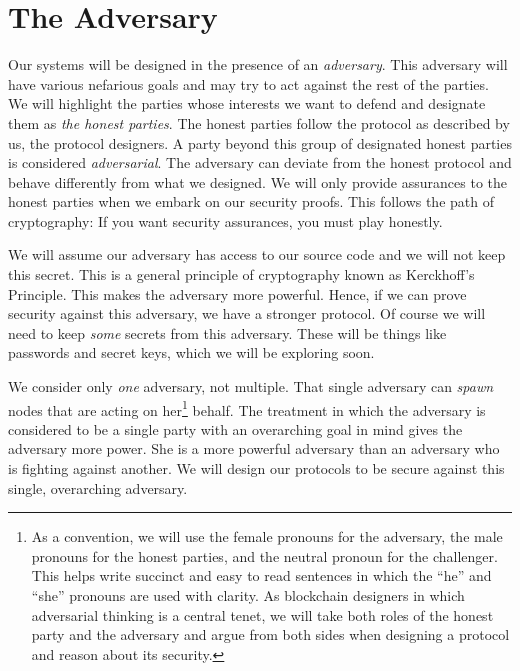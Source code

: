 \section{The Adversary}

Our systems will be designed in the presence of an \emph{adversary}. This adversary will
have various nefarious goals and may try to act against the rest of the parties. We will
highlight the parties whose interests we want to defend and designate them as
\emph{the honest parties}. The honest parties follow the protocol as described by us,
the protocol designers. A party beyond this group of designated honest parties is considered \emph{adversarial}.
The adversary can deviate from the honest protocol and behave differently from what we designed.
We will only provide assurances to the honest parties when we embark on our security proofs.
This follows the path of cryptography: If you want security assurances, you must play honestly.

We will assume our adversary has access to our source code and we will not keep this secret.
This is a general principle of cryptography known as Kerckhoff's Principle.
This makes the adversary more powerful. Hence, if we can prove security against this adversary,
we have a stronger protocol. Of course we will need to keep \emph{some} secrets from this adversary.
These will be things like passwords and secret keys, which we will be exploring soon.

We consider only \emph{one} adversary, not multiple. That single adversary can \emph{spawn}
nodes that are acting on her\footnote{As a convention, we will use the female pronouns for the adversary, the male pronouns for the honest
parties, and the neutral pronoun for the challenger.
This helps write succinct and easy to read sentences in which the ``he'' and ``she'' pronouns
are used with clarity. As blockchain designers in which adversarial thinking is a central tenet, we will
take both roles of the honest party and the adversary and argue from both sides when designing a protocol
and reason about its security.} behalf. The treatment in which the adversary is considered to be
a single party with an overarching goal in mind gives the adversary more power. She is a more
powerful adversary than an adversary who is fighting against another. We will design our protocols
to be secure against this single, overarching adversary.

